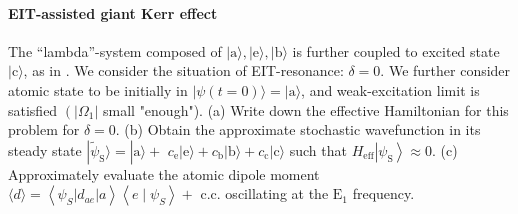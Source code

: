 \documentclass[hyperref, a4paper]{article}
\begin{document}
\paragraph{EIT-assisted giant Kerr effect} The ``lambda''-system composed of $|\text{a}\rangle,|\text{e}\rangle,|\text{b}\rangle$ is further coupled to excited state $|\text{c}\rangle$, as in . We consider the situation of EIT-resonance: $\delta=0$. We further consider atomic state to be initially in $|\psi(t=0)\rangle=|\mathrm{a}\rangle$, and weak-excitation limit is satisfied $\left(\left|\Omega_{1}\right|\right.$ small "enough").
(a) Write down the effective Hamiltonian for this problem for $\delta=0$.
(b) Obtain the approximate stochastic wavefunction in its steady state $|\tilde{\psi}_\text{S}\rangle=|\text{a}\rangle+$ ${c}_{\mathrm{e}}|\text{e}\rangle+c_\text{b}|\text{b}\rangle+c_\text{c}|\text{c}\rangle$ such that ${H}_{\mathrm{eff}}\left|\psi_{\mathrm{S}}\right\rangle \approx 0$.
(c) Approximately evaluate the atomic dipole moment $\langle {d}\rangle=\left\langle\psi_{S}\left|d_{a e}\right| a\right\rangle\left\langle e \mid \psi_{S}\right\rangle+$ c.c. oscillating at the $\mathrm{E}_{1}$ frequency.
\end{document}
